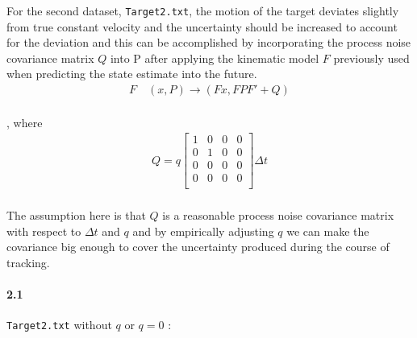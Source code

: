 \documentclass[a4paper]{article}
\begin{document}
For the second dataset, \texttt{Target2.txt}, the motion of the target deviates slightly from true constant velocity and the uncertainty should be increased to account for the deviation and this can be accomplished by incorporating the process noise covariance matrix $Q$ into P after applying the kinematic model $F$ previously used when predicting the state estimate into the future. \\
\begin{align*}
F \quad (x, P) \to (Fx, FPF' + Q)
\end{align*} \\
, where
\begin{align*}
Q = q \begin{bmatrix}
			1 & 0 & 0 & 0 \\
			0 & 1 & 0 & 0 \\
			0 & 0 & 0 & 0 \\
			0 & 0 & 0 & 0 \\
		\end{bmatrix} \Delta{t}
\end{align*} \\

The assumption here is that $Q$ is a reasonable process noise covariance matrix with respect to $\Delta{t}$ and $q$ and by empirically adjusting $q$ we can make the covariance big enough to cover the uncertainty produced during the course of tracking. \\

\paragraph{2.1 } \texttt{Target2.txt} without $q$ or $q=0$ : \\
\end{document}
